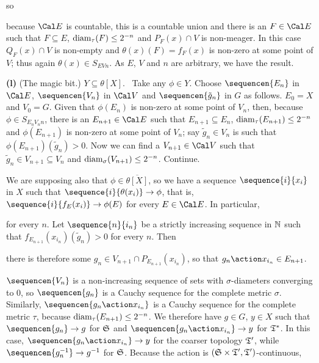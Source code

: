{

\noindent so


\noindent because $\Cal E$ is countable, this is a countable union and
there is an $F\in\Cal E$ such that $F\subseteq E$,
$\mathop{\text{diam}}_{\tau}(F)\le 2^{-n}$ and $P_F(x)\cap V$ is non-meager.   In this
case $Q_F(x)\cap V$
is non-empty and $\theta(x)(F)=f_F(x)$ is non-zero at some point of
$V$;  thus again $\theta(x)\in S_{EVn}$.   As $E$, $V$ and $n$ are
arbitrary, we have the result.\ \Qed

\medskip

{\bf (l)} (The magic bit.)   $Y\subseteq\theta[X]$.   \Prf\ Take any
$\phi\in Y$.   Choose $\sequencen{E_n}$ in $\Cal E$, $\sequencen{V_n}$
in $\Cal V$ and $\sequencen{\tilde g_n}$ in $G$ as follows.   $E_0=X$
and $V_0=G$.   Given that $\phi(E_n)$ is non-zero at some point of
$V_n$, then, because $\phi\in S_{E_nV_nn}$, there is an
$E_{n+1}\in\Cal E$ such that $E_{n+1}\subseteq E_n$,
$\mathop{\text{diam}}_{\tau}(E_{n+1})\le 2^{-n}$
and $\phi(E_{n+1})$ is non-zero at some point of $V_n$;  say
$\tilde g_n\in V_n$ is such that $\phi(E_{n+1})(\tilde g_n)>0$.
Now we can
find a $V_{n+1}\in\Cal V$ such that $\tilde g_n\in V_{n+1}\subseteq V_n$
and $\mathop{\text{diam}}_{\sigma}(V_{n+1})\le 2^{-n}$.   Continue.

We are supposing also that $\phi\in\overline{\theta[X]}$, so we have
a sequence $\sequence{i}{x_i}$ in $X$ such that
$\sequence{i}{\theta(x_i)}\to\phi$, that is,
$\sequence{i}{f_E(x_i)}\to\phi(E)$ for every $E\in\Cal E$.   In
particular,


\noindent for every $n$.    Let
$\sequence{n}{i_n}$ be a strictly increasing sequence in $\Bbb N$ such
that $f_{E_{n+1}}(x_{i_n})(\tilde g_n)>0$ for every $n$.   Then


\noindent there is therefore some $g_n\in V_{n+1}\cap
P_{E_{n+1}}(x_{i_n})$, so that $g_n\action x_{i_n}\in E_{n+1}$.

$\sequencen{V_n}$ is a non-increasing sequence of sets with
$\sigma$-diameters
converging to $0$, so $\sequencen{g_n}$ is a Cauchy sequence for the
complete metric $\sigma$.   Similarly, $\sequencen{g_n\action x_{i_n}}$
is a Cauchy sequence for the complete metric $\tau$, because
$\mathop{\text{diam}}_{\tau}(E_{n+1})\le 2^{-n}$.   We therefore have $g\in G$,
$y\in X$ such that $\sequencen{g_n}\to g$ for $\frak S$ and
$\sequencen{g_n\action x_{i_n}}\to y$ for $\frak T^*$.   In this case,
$\sequencen{g_n\action x_{i_n}}\to y$ for the coarser topology
$\frak T'$, while
$\sequencen{g_n^{-1}}\to g^{-1}$ for $\frak S$.   Because the action is
$(\frak S\times\frak T',\frak T')$-continuous,

}
